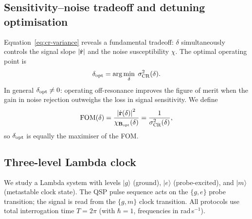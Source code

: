 \documentclass[12pt]{article}
\newcommand{\chivar}{\chi}       %
\newcommand{\dopt}{\delta_{\rm opt}}
\begin{document}
\subsection*{Sensitivity--noise tradeoff and detuning optimisation}

Equation~\eqref{eq:cr-variance} reveals a fundamental tradeoff: $\delta$
simultaneously controls the signal slope $\abs{\dot{\vb{r}}}$ and the noise
susceptibility $\chivar$.  The optimal operating point is
\begin{equation}\label{eq:dopt}
    \dopt = \arg\min_\delta\;\sigma^2_{\rm CR}(\delta).
\end{equation}
In general $\dopt \neq 0$: operating off-resonance improves the figure of merit
when the gain in noise rejection outweighs the loss in signal sensitivity.
We define
\begin{equation}\label{eq:fomdef}
    \mathrm{FOM}(\delta)
    = \frac{\abs{\dot{\vb{r}}(\delta)}^2}{\chivar_{\vb{B}_{\rm opt}}(\delta)}
    = \frac{1}{\sigma^2_{\rm CR}(\delta)},
\end{equation}
so $\dopt$ is equally the maximiser of the FOM.

\subsection*{Three-level Lambda clock}

We study a Lambda system with levels $\lvert g\rangle$ (ground),
$\lvert e\rangle$ (probe-excited), and $\lvert m\rangle$ (metastable clock
state).  The QSP pulse sequence acts on the $\{g, e\}$ probe transition; the
signal is read from the $\{g, m\}$ clock transition.
All protocols use total interrogation time $T = 2\pi$ (with $\hbar = 1$,
frequencies in rad\,s$^{-1}$).
\end{document}
